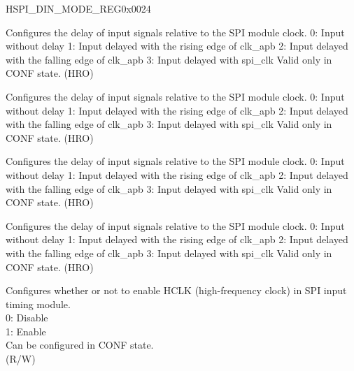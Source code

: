 \addtocounter{Regfloat}{-1}
\begin{register}{H}{SPI\_DIN\_MODE\_REG}{0x0024}
\begin{regdesc}\begin{reglist}
\item [Continued from the previous page...]

 \label{fielddesc:SPIDIN4MODE}\item [SPI\_DIN4\_MODE] Configures the delay of input signals relative to the SPI module clock.
 0: Input without delay
 1: Input delayed with the rising edge of clk\_apb
 2: Input delayed with the falling edge of clk\_apb
 3: Input delayed with spi\_clk
 Valid only in CONF state. (HRO)

\label{fielddesc:SPIDIN5MODE}\item [SPI\_DIN5\_MODE] Configures the delay of input signals relative to the SPI module clock.
 0: Input without delay
 1: Input delayed with the rising edge of clk\_apb
 2: Input delayed with the falling edge of clk\_apb
 3: Input delayed with spi\_clk
 Valid only in CONF state.
 (HRO)

 \label{fielddesc:SPIDIN6MODE}\item [SPI\_DIN6\_MODE] Configures the delay of input signals relative to the SPI module clock.
 0: Input without delay
 1: Input delayed with the rising edge of clk\_apb
 2: Input delayed with the falling edge of clk\_apb
 3: Input delayed with spi\_clk
 Valid only in CONF state.
 (HRO)

 \label{fielddesc:SPIDIN7MODE}\item [SPI\_DIN7\_MODE] Configures the delay of input signals relative to the SPI module clock.
 0: Input without delay
 1: Input delayed with the rising edge of clk\_apb
 2: Input delayed with the falling edge of clk\_apb
 3: Input delayed with spi\_clk
 Valid only in CONF state.
 (HRO)
\label{fielddesc:SPITIMINGHCLKACTIVE}\item [SPI\_TIMING\_HCLK\_ACTIVE] Configures whether or not to enable HCLK (high-frequency clock) in SPI input timing module.\\
0: Disable\\
1: Enable\\
Can be configured in CONF state. \\ (R/W)
\end{reglist}\end{regdesc}
\end{register}


